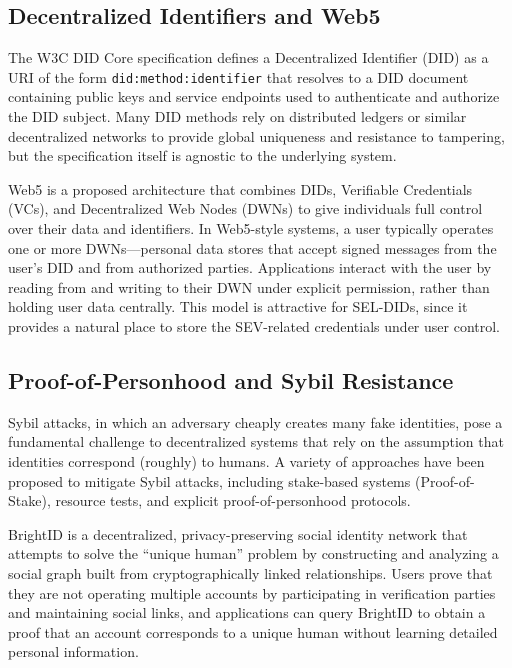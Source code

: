 \documentclass[11pt]{article}
\begin{document}
\subsection{Decentralized Identifiers and Web5}

The W3C DID Core specification defines a Decentralized Identifier (DID) as a URI of the form \texttt{did:method:identifier} that resolves to a DID document containing public keys and service endpoints used to authenticate and authorize the DID subject.\cite{w3c_did_core,curity_did} Many DID methods rely on distributed ledgers or similar decentralized networks to provide global uniqueness and resistance to tampering, but the specification itself is agnostic to the underlying system.

Web5 is a proposed architecture that combines DIDs, Verifiable Credentials (VCs), and Decentralized Web Nodes (DWNs) to give individuals full control over their data and identifiers.\cite{web5_overview,dwn_community_node} In Web5-style systems, a user typically operates one or more DWNs---personal data stores that accept signed messages from the user's DID and from authorized parties. Applications interact with the user by reading from and writing to their DWN under explicit permission, rather than holding user data centrally. This model is attractive for SEL-DIDs, since it provides a natural place to store the SEV-related credentials under user control.

\subsection{Proof-of-Personhood and Sybil Resistance}

Sybil attacks, in which an adversary cheaply creates many fake identities, pose a fundamental challenge to decentralized systems that rely on the assumption that identities correspond (roughly) to humans.\cite{gitcoin_web3_identity,sybil_attacks_blog} A variety of approaches have been proposed to mitigate Sybil attacks, including stake-based systems (Proof-of-Stake), resource tests, and explicit proof-of-personhood protocols.

BrightID is a decentralized, privacy-preserving social identity network that attempts to solve the ``unique human'' problem by constructing and analyzing a social graph built from cryptographically linked relationships.\cite{brightid_about,brightid_radix} Users prove that they are not operating multiple accounts by participating in verification parties and maintaining social links, and applications can query BrightID to obtain a proof that an account corresponds to a unique human without learning detailed personal information.
\end{document}
